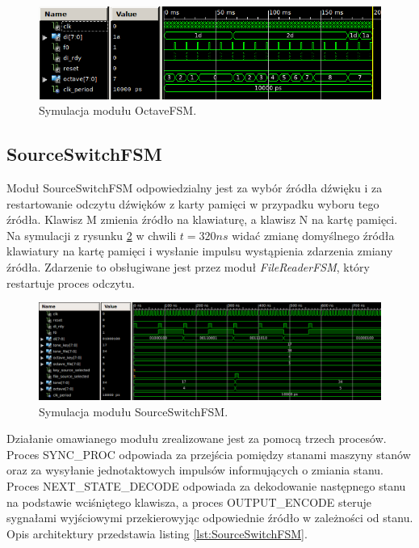 \documentclass[12pt]{article}
\begin{document}
\begin{figure}[h]
  \centering
  \includegraphics[decodearray={1 0 1 0 1 0}, width=\linewidth]{images/octavefsm.png}
  \caption{Symulacja modułu OctaveFSM.}
  \label{sim:octavefsm}
\end{figure}


\subsection{SourceSwitchFSM}
Moduł SourceSwitchFSM odpowiedzialny jest za wybór źródła dźwięku i za restartowanie odczytu dźwięków z karty pamięci w przypadku wyboru tego źródła. Klawisz M zmienia źródło na klawiaturę, a klawisz N na kartę pamięci. Na symulacji z rysunku \ref{sim:source} w chwili $t=320ns$ widać zmianę domyślnego źródła klawiatury na kartę pamięci i wysłanie impulsu wystąpienia zdarzenia zmiany źródła. Zdarzenie to obsługiwane jest przez moduł \textit{FileReaderFSM}, który restartuje proces odczytu.
\begin{figure}[h]
  \centering
  \includegraphics[decodearray={1 0 1 0 1 0}, width=\linewidth]{images/source}
  \caption{Symulacja modułu SourceSwitchFSM.}
  \label{sim:source}
\end{figure}

Działanie omawianego modułu zrealizowane jest za pomocą trzech procesów. Proces SYNC\_PROC odpowiada za przejścia pomiędzy stanami maszyny stanów oraz za wysyłanie jednotaktowych impulsów informujących o zmiania stanu. Proces NEXT\_STATE\_DECODE odpowiada za dekodowanie następnego stanu na podstawie wciśniętego klawisza, a proces OUTPUT\_ENCODE steruje sygnałami wyjściowymi przekierowyjąc odpowiednie źródło w zależności od stanu. Opis architektury przedstawia listing \ref{lst:SourceSwitchFSM}.
\end{document}
